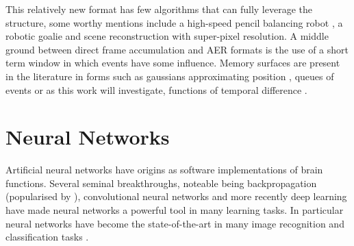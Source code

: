 This relatively new format has few algorithms that can fully leverage the structure, some worthy mentions include a high-speed pencil balancing robot \cite{conradt2009pencil}, a robotic goalie \cite{roboGoalie2013} and scene reconstruction with super-pixel resolution\cite{kim2008simultaneous}.
A middle ground between direct frame accumulation and AER formats is the use of a short term window in which events have some influence.
Memory surfaces are present in the literature in forms such as gaussians approximating position \cite{conradt2009pencil}, queues of events \cite{ni2012asynchronous} or as this work will investigate, functions of temporal difference \cite{afshar2016investigation}.


% 








\section{Neural Networks}     %
Artificial neural networks have origins as software implementations of brain functions\cite{mcculloch1943logical}.
Several seminal breakthroughs, noteable being backpropagation (popularised by \cite{Rumelhart1986}), convolutional neural networks \cite{lecun1998gradient} and more recently deep learning \cite{schmidhuber2015deep} have made neural networks a powerful tool in many learning tasks. 
In particular neural networks have become the state-of-the-art in many image recognition and classification tasks \cite{krizhevsky2012imagenet, szegedy2015going}.

